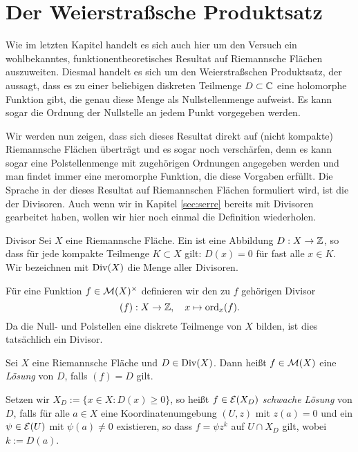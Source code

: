 
\section{Der Weierstraßsche Produktsatz}
\label{sec:Weierstrass}

Wie im letzten Kapitel handelt es sich auch hier um den Versuch ein
wohlbekanntes, funktionentheoretisches Resultat auf Riemannsche
Flächen auszuweiten. Diesmal handelt es sich um den
Weierstraßschen Produktsatz, der aussagt, dass es zu einer beliebigen
diskreten Teilmenge $D \subset \mathbb{C}$ eine holomorphe Funktion gibt, die
genau diese Menge als Nullstellenmenge aufweist. Es kann sogar die
Ordnung der Nullstelle an jedem Punkt vorgegeben werden.

Wir werden nun zeigen, dass sich dieses Resultat direkt auf (nicht
kompakte) Riemannsche Flächen überträgt und es sogar noch verschärfen,
denn es kann sogar eine Polstellenmenge mit zugehörigen Ordnungen
angegeben werden und man findet immer eine meromorphe Funktion, die
diese Vorgaben erfüllt. Die Sprache in der dieses Resultat auf
Riemannschen Flächen formuliert wird, ist die der Divisoren. Auch wenn
wir in Kapitel \ref{sec:serre} bereits mit Divisoren gearbeitet haben,
wollen wir hier noch einmal die Definition wiederholen.

\begin{defin}{Divisor}
  Sei $X$ eine Riemannsche Fläche. Ein  ist eine
  Abbildung $D: X \rightarrow \mathbb{Z}$, so dass für jede kompakte Teilmenge $K
  \subset X$ gilt: $D(x) = 0$ für fast alle $x \in K$. 
  Wir bezeichnen mit $\operatorname{Div}(X)$ die Menge aller Divisoren.
  
  Für eine Funktion $f \in \mathcal{M}(X)^\times$ definieren wir den zu $f$
  gehörigen Divisor
  \[
  (f): X \rightarrow \mathbb{Z}, \quad x \mapsto \operatorname{ord}_x(f).
  \]
  Da die Null- und Polstellen eine diskrete Teilmenge von $X$ bilden,
  ist dies tatsächlich ein Divisor.
\end{defin}

\begin{defin}
  \label{def:divisor-lsg}
  Sei $X$ eine Riemannsche Fläche und $D \in \operatorname{Div}(X)$. Dann heißt $f
  \in \mathcal{M}(X)$ eine \emph{Lösung} von $D$, falls $(f) = D$ gilt.
  
  Setzen wir $X_D := \{x \in X: D(x) \geq 0 \}$, so heißt $f \in
  \mathcal{E}(X_D)$ \emph{schwache Lösung} von $D$, falls für alle $a \in X$
  eine Koordinatenumgebung $(U,z)$ mit $z(a) = 0$ und ein $\psi \in
  \mathcal{E}(U)$ mit $\psi(a) \neq 0$ existieren, so dass $f = \psi z^k$
  auf $ U \cap X_D$ gilt, wobei $k := D(a)$.
\end{defin}


